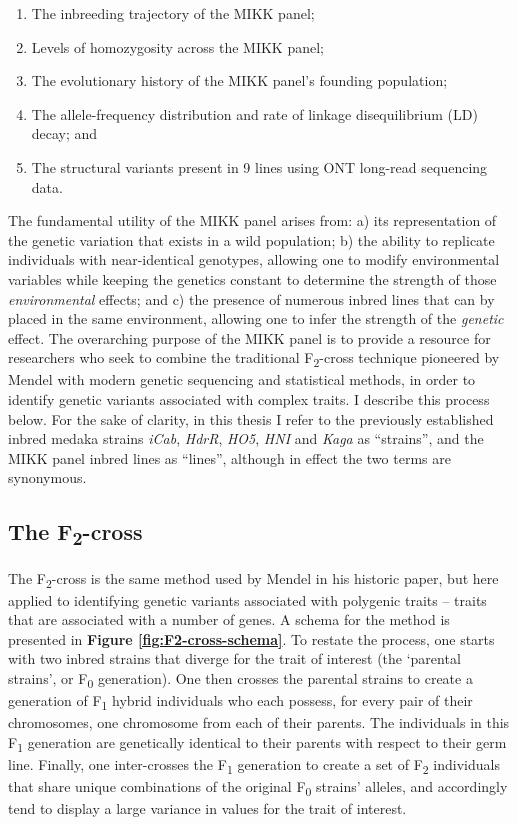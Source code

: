 \documentclass[
]{book}
\begin{document}
\begin{enumerate}
\def\labelenumi{\arabic{enumi}.}
\item
  The inbreeding trajectory of the MIKK panel;
\item
  Levels of homozygosity across the MIKK panel;
\item
  The evolutionary history of the MIKK panel's founding population;
\item
  The allele-frequency distribution and rate of linkage disequilibrium (LD) decay; and
\item
  The structural variants present in 9 lines using ONT long-read sequencing data.
\end{enumerate}

The fundamental utility of the MIKK panel arises from: a) its representation of the genetic variation that exists in a wild population; b) the ability to replicate individuals with near-identical genotypes, allowing one to modify environmental variables while keeping the genetics constant to determine the strength of those \emph{environmental} effects; and c) the presence of numerous inbred lines that can by placed in the same environment, allowing one to infer the strength of the \emph{genetic} effect. The overarching purpose of the MIKK panel is to provide a resource for researchers who seek to combine the traditional F\textsubscript{2}-cross technique pioneered by Mendel with modern genetic sequencing and statistical methods, in order to identify genetic variants associated with complex traits. I describe this process below. For the sake of clarity, in this thesis I refer to the previously established inbred medaka strains \emph{iCab}, \emph{HdrR}, \emph{HO5}, \emph{HNI} and \emph{Kaga} as ``strains'', and the MIKK panel inbred lines as ``lines'', although in effect the two terms are synonymous.

\hypertarget{the-f2-cross}{%
\subsection{\texorpdfstring{The F\textsubscript{2}-cross}{The F2-cross}}\label{the-f2-cross}}

The F\textsubscript{2}-cross is the same method used by Mendel in his historic paper, but here applied to identifying genetic variants associated with polygenic traits -- traits that are associated with a number of genes. A schema for the method is presented in \textbf{Figure \ref{fig:F2-cross-schema}}. To restate the process, one starts with two inbred strains that diverge for the trait of interest (the `parental strains', or F\textsubscript{0} generation). One then crosses the parental strains to create a generation of F\textsubscript{1} hybrid individuals who each possess, for every pair of their chromosomes, one chromosome from each of their parents. The individuals in this F\textsubscript{1} generation are genetically identical to their parents with respect to their germ line. Finally, one inter-crosses the F\textsubscript{1} generation to create a set of F\textsubscript{2} individuals that share unique combinations of the original F\textsubscript{0} strains' alleles, and accordingly tend to display a large variance in values for the trait of interest.
\end{document}
